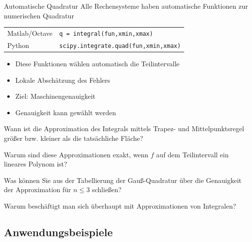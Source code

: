 \begin{frame}{Automatische Quadratur}
  Alle Rechensysteme haben automatische Funktionen zur numerischen Quadratur
  \begin{center}
      \begin{tabular}{|l|l|}
      \hline
           Matlab/Octave & \texttt{q = integral(fun,xmin,xmax)} \\
           Python & \texttt{scipy.integrate.quad(fun,xmin,xmax)} \\
           \hline
      \end{tabular}
  \end{center}
  \begin{itemize}
      \item Diese Funktionen wählen automatisch die Teilintervalle
      \item Lokale Abschätzung des Fehlers
      \item Ziel: Maschinengenauigkeit
      \item Genauigkeit kann gewählt werden
  \end{itemize}
\end{frame}

\begin{Abschluss}
\item Wann ist die Approximation des Integrals mittels Trapez- und Mittelpunktsregel größer bzw. kleiner als die tatsächliche Fläche?
\item Warum sind diese Approximationen exakt, wenn $f$ auf dem Teilintervall ein lineares Polynom ist?
\item Was können Sie aus der Tabellierung der Gauß-Quadratur über die Genauigkeit der Approximation für $n \leq 3$ schließen?
\item Warum beschäftigt man sich überhaupt mit Approximationen von Integralen?
\end{Abschluss}

\subsection{Anwendungsbeispiele}

